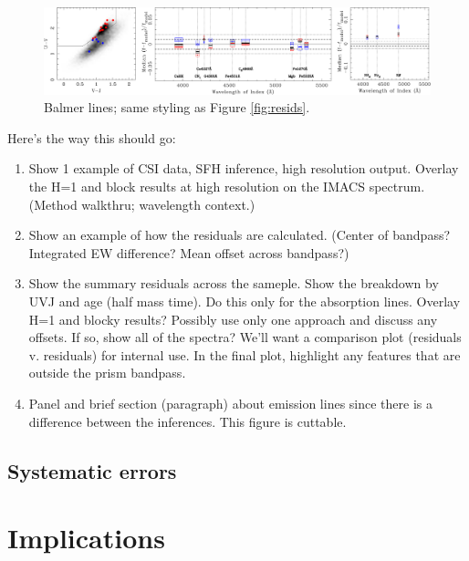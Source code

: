 \documentclass[a4paper,fleqn,usenatbib]{mnras}
\newcommand{\benum}{\begin{enumerate}}
\newcommand{\eenum}{\end{enumerate}}
\begin{document}
\begin{figure}
\includegraphics[width = \textwidth]{residuals}
\caption{Balmer lines; same styling as Figure \ref{fig:resids}.}
\label{fig:balmer}
\end{figure}


Here's the way this should go:
\benum
	\item Show 1 example of CSI data, SFH inference, high resolution output. Overlay the H=1 and block
		results at high resolution on the IMACS spectrum. (Method walkthru; wavelength context.)
	\item Show an example of how the residuals are calculated. (Center of bandpass? Integrated EW
		difference? Mean offset across bandpass?)
	\item Show the summary residuals across the sameple. Show the breakdown by UVJ and age 
		(half mass time). 	Do this only for the absorption lines. Overlay H=1 and blocky results? Possibly use
		only one approach and discuss any offsets. If so, show all of the spectra? We'll want a comparison 
		plot (residuals v. residuals) for internal use. In the final plot, highlight any features that are 
		outside the 	prism bandpass.
	\item Panel and brief section (paragraph) about emission lines since there is a difference between
		the inferences. This figure is cuttable.
\eenum
\fi



\subsection{Systematic errors}
\label{sec:systematics}



\section{Implications}
\label{sec:discussion}
\end{document}

